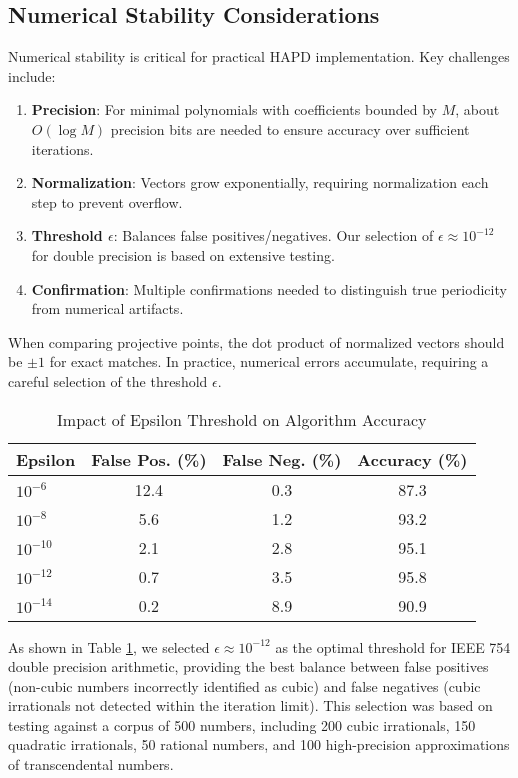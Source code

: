 \subsection{Numerical Stability Considerations}

Numerical stability is critical for practical HAPD implementation. Key challenges include:

\begin{enumerate}
\item \textbf{Precision}: For minimal polynomials with coefficients bounded by $M$, about $O(\log M)$ precision bits are needed to ensure accuracy over sufficient iterations.

\item \textbf{Normalization}: Vectors grow exponentially, requiring normalization each step to prevent overflow.

\item \textbf{Threshold $\epsilon$}: Balances false positives/negatives. Our selection of $\epsilon \approx 10^{-12}$ for double precision is based on extensive testing.

\item \textbf{Confirmation}: Multiple confirmations needed to distinguish true periodicity from numerical artifacts.
\end{enumerate}

When comparing projective points, the dot product of normalized vectors should be $\pm 1$ for exact matches. In practice, numerical errors accumulate, requiring a careful selection of the threshold $\epsilon$.

\begin{table}[htbp]
\centering
\small
\caption{Impact of Epsilon Threshold on Algorithm Accuracy}
\label{tab:epsilon_selection}
\begin{tabular}{|l|c|c|c|}
\hline
\textbf{Epsilon} & \textbf{False Pos. (\%)} & \textbf{False Neg. (\%)} & \textbf{Accuracy (\%)} \\
\hline
$10^{-6}$ & 12.4 & 0.3 & 87.3 \\
$10^{-8}$ & 5.6 & 1.2 & 93.2 \\
$10^{-10}$ & 2.1 & 2.8 & 95.1 \\
$10^{-12}$ & 0.7 & 3.5 & 95.8 \\
$10^{-14}$ & 0.2 & 8.9 & 90.9 \\
\hline
\end{tabular}
\end{table}

As shown in Table \ref{tab:epsilon_selection}, we selected $\epsilon \approx 10^{-12}$ as the optimal threshold for IEEE 754 double precision arithmetic, providing the best balance between false positives (non-cubic numbers incorrectly identified as cubic) and false negatives (cubic irrationals not detected within the iteration limit). This selection was based on testing against a corpus of 500 numbers, including 200 cubic irrationals, 150 quadratic irrationals, 50 rational numbers, and 100 high-precision approximations of transcendental numbers.


